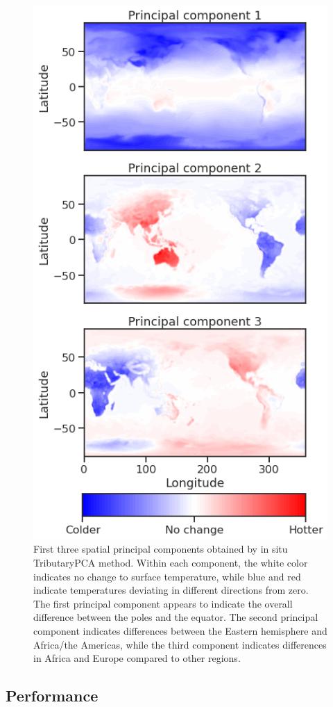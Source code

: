 \documentclass{juliacon}
\begin{document}
\begin{figure}
    \centering
    \includegraphics[width=0.8\linewidth]{figures/insitu_pca.png}
    \caption{First three spatial principal components obtained by in situ TributaryPCA method. Within each component, the white color indicates no change to surface temperature, while blue and red indicate temperatures deviating in different directions from zero. The first principal component appears to indicate the overall difference between the poles and the equator. The second principal component indicates differences between the Eastern hemisphere and Africa/the Americas, while the third component indicates differences in Africa and Europe compared to other regions.}
    \label{fig:pca_results}
\end{figure}

\subsection{Performance}
\end{document}
